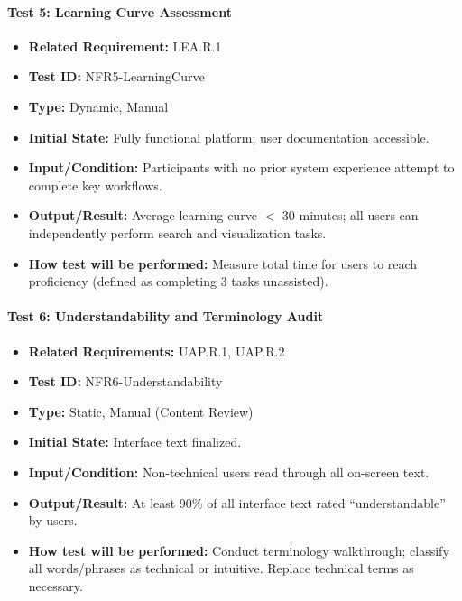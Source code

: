 \documentclass[12pt, titlepage]{article}
\begin{document}
\paragraph{Test 5: Learning Curve Assessment}
\begin{itemize}
    \item \textbf{Related Requirement:} LEA.R.1
    \item \textbf{Test ID:} NFR5-LearningCurve
    \item \textbf{Type:} Dynamic, Manual
    \item \textbf{Initial State:} Fully functional platform; user documentation accessible.
    \item \textbf{Input/Condition:} Participants with no prior system experience attempt to complete key workflows.
    \item \textbf{Output/Result:} Average learning curve $<$ 30 minutes; all users can independently perform search and visualization tasks.
    \item \textbf{How test will be performed:} Measure total time for users to reach proficiency (defined as completing 3 tasks unassisted).
\end{itemize}

\paragraph{Test 6: Understandability and Terminology Audit}
\begin{itemize}
    \item \textbf{Related Requirements:} UAP.R.1, UAP.R.2
    \item \textbf{Test ID:} NFR6-Understandability
    \item \textbf{Type:} Static, Manual (Content Review)
    \item \textbf{Initial State:} Interface text finalized.
    \item \textbf{Input/Condition:} Non-technical users read through all on-screen text.
    \item \textbf{Output/Result:} At least 90\% of all interface text rated “understandable” by users.
    \item \textbf{How test will be performed:} Conduct terminology walkthrough; classify all words/phrases as technical or intuitive. Replace technical terms as necessary.
\end{itemize}
\end{document}
